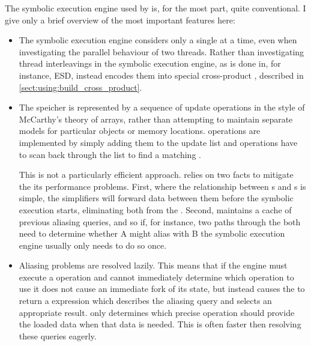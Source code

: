 The symbolic execution engine used by {\implementation} is, for the
most part, quite conventional.  I give only a brief overview of the
most important features here:
\begin{itemize}
\item The symbolic execution engine considers only a single
  {\StateMachine} at a time, even when investigating the parallel
  behaviour of two threads.  Rather than investigating thread
  interleavings in the symbolic execution engine, as is done in, for
  instance, ESD\cite{Zamfir2010}, {\technique} instead encodes them
  into special cross-product {\StateMachines}, described in
  \autoref{sect:using:build_cross_product}.

\item The {\StateMachine} speicher is represented by a sequence of
  update operations in the style of McCarthy's theory of
  arrays\needCite{}, rather than attempting to maintain separate
  models for particular objects or memory locations.  
  operations are implemented by simply adding them to the update list
  and  operations have to scan back through the list to
  find a matching .

  This is not a particularly efficient approach.  {\Implementation}
  relies on two facts to mitigate the its performance problems.
  First, where the relationship between s and
  s is simple, the {\StateMachine} simplifiers will
  forward data between them before the symbolic execution starts,
  eliminating both from the {\StateMachine}.  Second,
  {\implementation} maintains a cache of previous aliasing queries,
  and so if, for instance, two paths through the {\StateMachine} both
  need to determine whether  A might alias with
   B the symbolic execution engine usually only needs to
  do so once.

\item Aliasing problems are resolved lazily.  This means that if the
  engine must execute a  operation and cannot immediately
  determine which  operation to use it does not cause an
  immediate fork of its state, but instead causes the  to
  return a {\StateMachine} expression which describes the aliasing
  query and selects an appropriate result.  {\Implementation} only
  determines which precise  operation should provide the
  loaded data when that data is needed.  This is often faster then
  resolving these queries eagerly.


\end{itemize}
